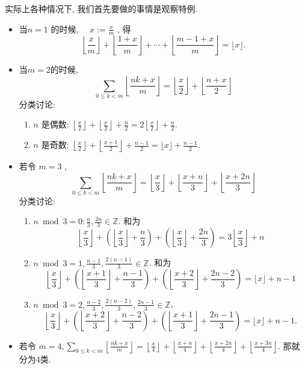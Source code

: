 \documentclass{ctexart}
\begin{document}
实际上各种情况下, 我们首先要做的事情是观察特例. 
\begin{itemize}
    \item 当$n=1$ 的时候, $\quad x:=\frac{x}{m}$ , 得 $$\left\lfloor\frac{x}{m}\right\rfloor+\left\lfloor\frac{1+x}{m}\right\rfloor+\cdots+\left\lfloor\frac{m-1+x}{m}\right\rfloor=\lfloor x\rfloor.$$
    \item 当$m=2$的时候, 
    $$
    \sum_{0 \leqslant k<m}\left\lfloor\frac{n k+x}{m}\right\rfloor=\left\lfloor\frac{x}{2}\right\rfloor+\left\lfloor\frac{n+x}{2}\right\rfloor
    $$
    分类讨论: 
\begin{enumerate}
    \item $n$ 是偶数: $\left\lfloor\frac{x}{2}\right\rfloor+\left\lfloor\frac{x}{2}\right\rfloor+\frac{n}{2}=2\left\lfloor\frac{x}{2}\right\rfloor+\frac{n}{2}$.
    \item $n$ 是奇数: $\left\lfloor\frac{x}{2}\right\rfloor+\left\lfloor\frac{x+1}{2}\right\rfloor+\frac{n-1}{2}=\lfloor x\rfloor+\frac{n-1}{2}$.
\end{enumerate}
\item 若令 $m=3$ , $$\sum_{0 \leqslant k<m}\left\lfloor\frac{n k+x}{m}\right\rfloor=\left\lfloor\frac{x}{3}\right\rfloor+\left\lfloor\frac{x+n}{3}\right\rfloor+\left\lfloor\frac{x+2 n}{3}\right\rfloor$$ 分类讨论: 
\begin{enumerate}
    \item $n \bmod 3=0: \frac{n}{3}, \frac{2 n}{3} \in \mathbb{Z}$. 和为$$
    \left\lfloor\frac{x}{3}\right\rfloor+\left(\left\lfloor\frac{x}{3}\right\rfloor+\frac{n}{3}\right)+\left(\left\lfloor\frac{x}{3}\right\rfloor+\frac{2 n}{3}\right)=3\left\lfloor\frac{x}{3}\right\rfloor+n
    $$
    \item $n \bmod 3=1, \frac{n-1}{3}, \frac{2(n-1)}{3} \in \mathbb{Z}$. 和为$$\left\lfloor\frac{x}{3}\right\rfloor+\left(\left\lfloor\frac{x+1}{3}\right\rfloor+\frac{n-1}{3}\right)+\left(\left\lfloor\frac{x+2}{3}\right\rfloor+\frac{2 n-2}{3}\right)=\lfloor x\rfloor+n-1$$
    \item $n \bmod 3=2, \frac{n-2}{3}, \frac{2(n-2)}{3}, \frac{2 n-1}{3} \in \mathbb{Z}$, $$\left\lfloor\frac{x}{3}\right\rfloor+\left(\left\lfloor\frac{x+2}{3}\right\rfloor+\frac{n-2}{3}\right)+\left(\left\lfloor\frac{x+1}{3}\right\rfloor+\frac{2 n-1}{3}\right)=\lfloor x\rfloor+n-1.$$
\end{enumerate}
\item 若令 $m=4, \sum_{0 \leq k<m}\left\lfloor\frac{n k+x}{m}\right\rfloor=\left\lfloor\frac{x}{4}\right\rfloor+\left\lfloor\frac{x+n}{4}\right\rfloor+\left\lfloor\frac{x+2 n}{4}\right\rfloor+\left\lfloor\frac{x+3 n}{4}\right\rfloor$. 那就分为4类. 

\end{itemize}
\end{document}
